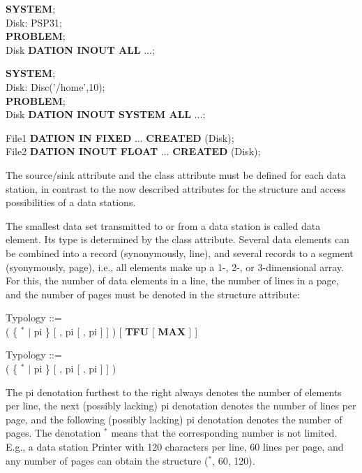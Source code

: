 \begin{removed}
{\bf SYSTEM};\\
\x Disk: PSP31; \\
{\bf PROBLEM};\\
 Disk {\bf DATION INOUT ALL} ...;\\
\end{removed}
\begin{added}
{\bf SYSTEM};\\
\x Disk: Disc('/home',10);\\
{\bf PROBLEM};\\
 Disk {\bf DATION INOUT SYSTEM ALL} ...;\\
\end{added}
 File1 {\bf DATION IN FIXED} ... {\bf CREATED} (Disk);\\
 File2 {\bf DATION INOUT FLOAT} ... {\bf CREATED} (Disk);

The source/sink attribute and the class attribute must be defined for
each data station, in contrast to the now described attributes for the
structure and access possibilities of a data stations.

The smallest data set transmitted to or from a data station is called
data element. Its type is determined by the class attribute. Several
data elements can be combined into a record (synonymously, line), and
several records to a segment (syonymously, page), i.e., all elements
make up a 1-, 2-, or 3-dimensional array. For this, the number of data
elements in a line, the number of lines in a page, and the number of
pages must be denoted in the structure attribute:

\begin{removed}
Typology ::= \\
 ( \{ $^*$ $\mid$ pi \} [ , pi [ , pi ] ] ) [ {\bf TFU} [ {\bf MAX} ] ]
\end{removed}
\begin{added}
Typology ::= \\
 ( \{ $^*$ $\mid$ pi \} [ , pi [ , pi ] ] ) 
\end{added}

The pi denotation furthest to the right always denotes the number of
elements per line, the next (possibly lacking) pi denotation denotes
the number of lines per page, and the following (possibly lacking) pi
denotation denotes the number of pages. The denotation $^*$ means that
the corresponding number is not limited. E.g., a data station Printer
with 120 characters per line, 60 lines per page, and any number of pages
can obtain the structure ($^*$, 60, 120).

